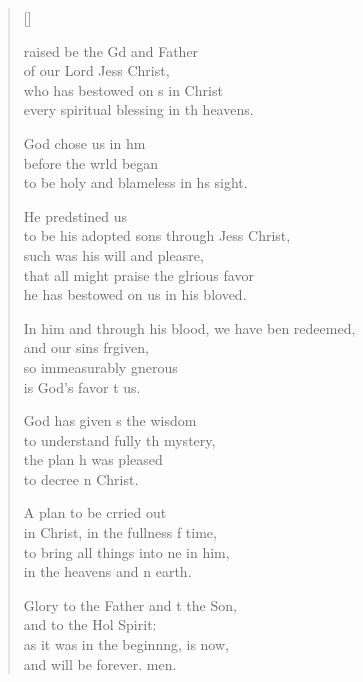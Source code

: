 \settowidth{\versewidth}{In him and through his blood, we have been redeemed, *}
\begin{verse}[\versewidth]
  \begin{patverse}
raised be the Gd and Father\Med\\
of our Lord Jess Christ,\\
who has bestowed on s in Christ\Med\\
every spiritual blessing in th heavens.

God chose us in h\pointup{\i}m\Flex\\
before the wrld began\Med\\
to be holy and blameless in h\pointup{\i}s sight.

He predstined us\Med\\
to be his adopted sons through Jess Christ,\Med\\
such was his will and pleasre,\Flex\\
that all might praise the glrious favor\Med\\
he has bestowed on us in his bloved.

In him and through his blood, we have ben redeemed,\Med\\
and our sins frgiven,\\
so immeasurably gnerous\Med\\
is God’s favor t us.

God has given s the wisdom\Med\\
to understand fully th mystery,\\
the plan h was pleased\Med\\
to decree \pointup{\i}n Christ.

A plan to be crried out\Med\\
in Christ, in the fullness f time,\\
to bring all things into ne in him,\Med\\
in the heavens and n earth.

Glory to the Father and t the Son,\Med\\
and to the Hol Spirit:\\
as it was in the beginn\pointup{\i}ng, is now,\Med\\
and will be forever. men.
  \end{patverse}
\end{verse}
